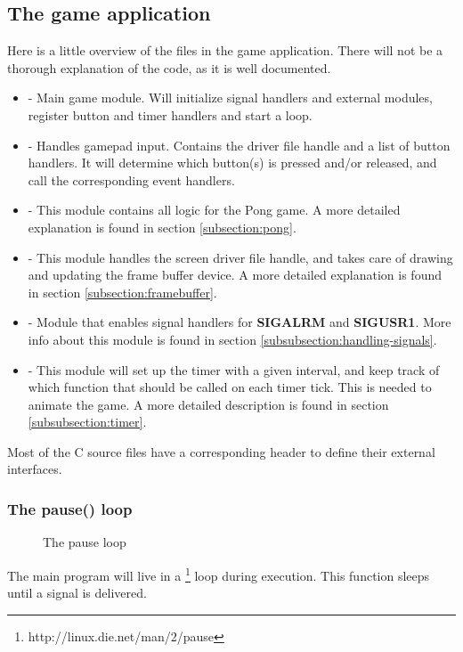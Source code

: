 \subsection{The game application}
\label{subsection:the_game_application}
Here is a little overview of the files in the game application. There will not be a thorough explanation of the code, as it is well documented.

\begin{itemize}
	\item {} - Main game module. Will initialize signal handlers and external modules, register button and timer handlers and start a  loop. 
	\item {} - Handles gamepad input. Contains the driver file handle and a list of button handlers. It will determine which button(s) is pressed and/or released, and call the corresponding event handlers.
	\item {} - This module contains all logic for the Pong game. A more detailed explanation is found in section \ref{subsection:pong}.
	\item {} - This module handles the screen driver file handle, and takes care of drawing and updating the frame buffer device. A more detailed explanation is found in section \ref{subsection:framebuffer}.
	\item {} - Module that enables signal handlers for \textbf{SIGALRM} and \textbf{SIGUSR1}. More info about this module is found in section \ref{subsubsection:handling-signals}.
	\item {} - This module will set up the timer with a given interval, and keep track of which function that should be called on each timer tick. This is needed to animate the game. A more detailed description is found in section \ref{subsubsection:timer}.
\end{itemize}

Most of the C source files have a corresponding header to define their external interfaces.

\subsubsection{The pause() loop}
\begin{figure}[h]
	\centering
	
	\caption{The pause loop}
	\label{fig:pause-loop}
\end{figure}
The main program will live in a \footnote{http://linux.die.net/man/2/pause} loop during execution. This function sleeps until a signal is delivered.

